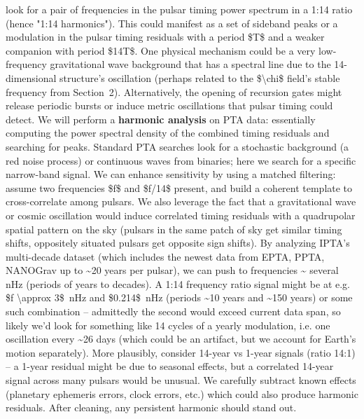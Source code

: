 \documentclass[]{article}
\begin{document}
\begin{enumerate}
  look for a pair of frequencies in the pulsar timing power spectrum in
  a 1:14 ratio (hence "1:14 harmonics"). This could manifest as a set of
  sideband peaks or a modulation in the pulsar timing residuals with a
  period \$T\$ and a weaker companion with period \$14T\$. One physical
  mechanism could be a very low-frequency gravitational wave background
  that has a spectral line due to the 14-dimensional structure's
  oscillation (perhaps related to the \$\textbackslash{}chi\$ field's
  stable frequency from Section~2). Alternatively, the opening of
  recursion gates might release periodic bursts or induce metric
  oscillations that pulsar timing could detect. We will perform a
  \textbf{harmonic analysis} on PTA data: essentially computing the
  power spectral density of the combined timing residuals and searching
  for peaks. Standard PTA searches look for a stochastic background (a
  red noise process) or continuous waves from binaries; here we search
  for a specific narrow-band signal. We can enhance sensitivity by using
  a matched filtering: assume two frequencies \$f\$ and \$f/14\$
  present, and build a coherent template to cross-correlate among
  pulsars. We also leverage the fact that a gravitational wave or cosmic
  oscillation would induce correlated timing residuals with a
  quadrupolar spatial pattern on the sky​ (pulsars in the same patch of
  sky get similar timing shifts, oppositely situated pulsars get
  opposite sign shifts). By analyzing IPTA's multi-decade dataset (which
  includes the newest data from EPTA, PPTA, NANOGrav up to
  \textasciitilde{}20 years per pulsar), we can push to frequencies
  \textasciitilde{} several nHz (periods of years to decades). A 1:14
  frequency ratio signal might be at e.g. \$f \textbackslash{}approx
  3\$~nHz and \$0.214\$~nHz (periods \textasciitilde{}10 years and
  \textasciitilde{}150 years) or some such combination -- admittedly the
  second would exceed current data span, so likely we'd look for
  something like 14 cycles of a yearly modulation, i.e. one oscillation
  every \textasciitilde{}26 days (which could be an artifact, but we
  account for Earth's motion separately). More plausibly, consider
  14-year vs 1-year signals (ratio 14:1) -- a 1-year residual might be
  due to seasonal effects, but a correlated 14-year signal across many
  pulsars would be unusual. We carefully subtract known effects
  (planetary ephemeris errors, clock errors, etc.) which could also
  produce harmonic residuals​. After cleaning, any persistent harmonic
  should stand out.\\

\end{enumerate}
\end{document}
